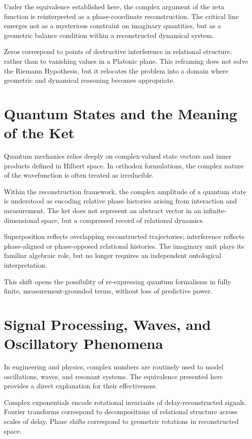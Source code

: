 \documentclass[12pt]{book}  %
\begin{document}
Under the equivalence established here, the complex argument of the zeta function is reinterpreted as a phase-coordinate reconstruction. The critical line emerges not as a mysterious constraint on imaginary quantities, but as a geometric balance condition within a reconstructed dynamical system.

Zeros correspond to points of destructive interference in relational structure, rather than to vanishing values in a Platonic plane. This reframing does not solve the Riemann Hypothesis, but it relocates the problem into a domain where geometric and dynamical reasoning becomes appropriate.

\section*{Quantum States and the Meaning of the Ket}

Quantum mechanics relies deeply on complex-valued state vectors and inner products defined in Hilbert space. In orthodox formulations, the complex nature of the wavefunction is often treated as irreducible.

Within the reconstruction framework, the complex amplitude of a quantum state is understood as encoding relative phase histories arising from interaction and measurement. The ket does not represent an abstract vector in an infinite-dimensional space, but a compressed record of relational dynamics.

Superposition reflects overlapping reconstructed trajectories; interference reflects phase-aligned or phase-opposed relational histories. The imaginary unit plays its familiar algebraic role, but no longer requires an independent ontological interpretation.

This shift opens the possibility of re-expressing quantum formalisms in fully finite, measurement-grounded terms, without loss of predictive power.

\section*{Signal Processing, Waves, and Oscillatory Phenomena}

In engineering and physics, complex numbers are routinely used to model oscillations, waves, and resonant systems. The equivalence presented here provides a direct explanation for their effectiveness.

Complex exponentials encode rotational invariants of delay-reconstructed signals. Fourier transforms correspond to decompositions of relational structure across scales of delay. Phase shifts correspond to geometric rotations in reconstructed space.
\end{document}
